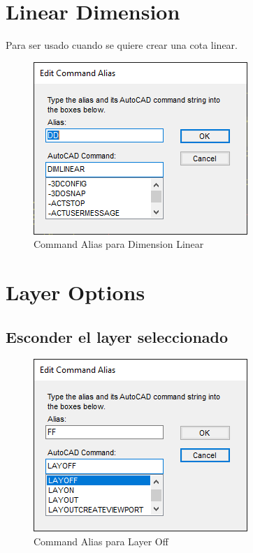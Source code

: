 \documentclass{report}
\begin{document}
\section{Linear Dimension}

Para ser usado cuando se quiere crear una cota linear.

\begin{figure}[H]
	\centering
	\includegraphics[width=0.7\linewidth, height=0.45\textheight,keepaspectratio]{Imagenes/autocad_alias_lineardimension}
	\caption{Command Alias para Dimension Linear}
	\label{fig:autocadaliaslineardimension}
\end{figure}



\section{Layer Options}

\subsection{Esconder el layer seleccionado}

\begin{figure}[H]
	\centering
	\includegraphics[width=0.7\linewidth, height=0.45\textheight,keepaspectratio]{Imagenes/autocad_alias_layeroptions_01}
	\caption{Command Alias para Layer Off}
	\label{fig:autocadaliaslayeroptions01}
\end{figure}
\end{document}
